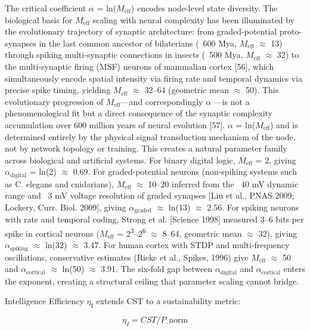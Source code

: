 \documentclass[a4paper,12pt]{article}
\begin{document}
The critical coefficient  $\alpha$  = ln($M_{\text{eff}}$) encodes node-level state diversity.
The biological basis for $M_{\text{eff}}$ scaling with neural complexity has been illuminated by the evolutionary trajectory of synaptic architecture: from graded-potential proto-synapses in the last common ancestor of bilaterians (~600 Mya, $M_{\text{eff}}$  $\approx$  13) through spiking multi-synaptic connections in insects (~500 Mya, $M_{\text{eff}}$  $\approx$  32) to the multi-synaptic firing
(MSF) neurons of mammalian cortex [56], which simultaneously encode spatial intensity via firing rate and temporal dynamics via precise spike timing, yielding $M_{\text{eff}}$  $\approx$  32--64 (geometric mean  $\approx$  50).
This evolutionary progression of $M_{\text{eff}}$---and correspondingly  $\alpha$ ---is not a phenomenological fit but a direct consequence of the synaptic complexity accumulation over 600 million years of neural evolution [57].  $\alpha$  = ln($M_{\text{eff}}$) and is determined entirely by the physical signal transduction mechanism of the node, not by network topology or training.
This creates a natural parameter family across biological and artificial systems.
For binary digital logic, $M_{\text{eff}}$ = 2, giving $\alpha_{\text{digital}}$ = ln(2)  $\approx$  0.69.
For graded-potential neurons (non-spiking systems such as C. elegans and cnidarians), $M_{\text{eff}}$  $\approx$  10--20 inferred from the ~40 mV dynamic range and ~3 mV voltage resolution of graded synapses [Liu et al., PNAS 2009; Lockery, Curr.
Biol. 2009], giving $\alpha_{\text{graded}}$  $\approx$  ln(13)  $\approx$  2.56.
For spiking neurons with rate and temporal coding, Strong et al. [Science 1998] measured 3--6 bits per spike in cortical neurons ($M_{\text{eff}}$ = 2\textsuperscript{3}--2\textsuperscript{6}  $\approx$  8--64, geometric mean  $\approx$  32), giving $\alpha_{\text{spiking}}$  $\approx$  ln(32)  $\approx$  3.47.
For human cortex with STDP and multi-frequency oscillations, conservative estimates (Rieke et al., Spikes, 1996) give $M_{\text{eff}}$  $\approx$  50 and $\alpha_{\text{cortical}}$  $\approx$  ln(50)  $\approx$  3.91.
The six-fold gap between $\alpha_{\text{digital}}$ and $\alpha_{\text{cortical}}$ enters the exponent, creating a structural ceiling that parameter scaling cannot bridge.

Intelligence Efficiency $\eta_{\text{I}}$ extends CST to a sustainability metric:

\begin{equation}
\eta_I = CST / P\_{\text{norm}} \tag{5}
\end{equation}
\end{document}

